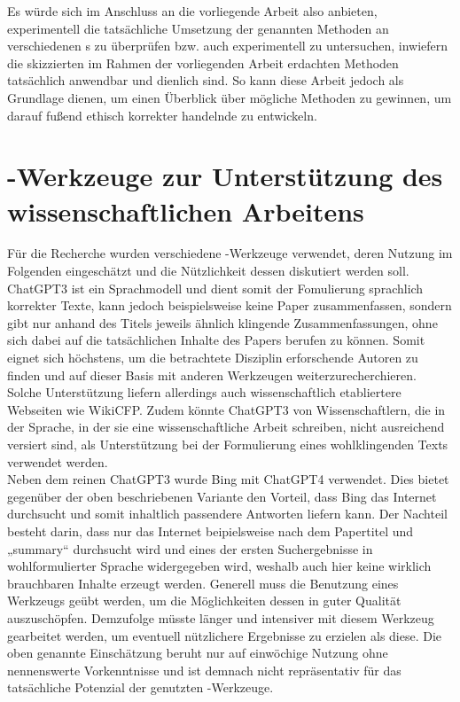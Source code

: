 \documentclass[hidelinks,12pt]{report}
\begin{document}
Es würde sich im Anschluss an die vorliegende Arbeit also anbieten, experimentell die tatsächliche Umsetzung der genannten Methoden an verschiedenen s zu überprüfen bzw. auch experimentell zu untersuchen, inwiefern die skizzierten im Rahmen der vorliegenden Arbeit erdachten Methoden tatsächlich anwendbar und dienlich sind.
So kann diese Arbeit jedoch als Grundlage dienen, um einen Überblick über mögliche Methoden zu gewinnen, um darauf fußend ethisch korrekter handelnde  zu entwickeln.


\chapter{-Werkzeuge zur Unterstützung des wissenschaftlichen Arbeitens}
Für die Recherche wurden verschiedene -Werkzeuge verwendet, deren Nutzung im Folgenden eingeschätzt und die Nützlichkeit dessen diskutiert werden soll. 
ChatGPT3 ist ein Sprachmodell und dient somit der Fomulierung sprachlich korrekter Texte, kann jedoch beispielsweise keine Paper zusammenfassen, sondern gibt nur anhand des Titels jeweils ähnlich klingende Zusammenfassungen, ohne sich dabei auf die tatsächlichen Inhalte des Papers berufen zu können. Somit eignet sich höchstens, um die betrachtete Disziplin erforschende Autoren zu finden und auf dieser Basis mit anderen Werkzeugen weiterzurecherchieren. Solche Unterstützung liefern allerdings auch wissenschaftlich etabliertere Webseiten wie WikiCFP. Zudem könnte ChatGPT3 von Wissenschaftlern, die in der Sprache, in der sie eine wissenschaftliche Arbeit schreiben, nicht ausreichend versiert sind, als Unterstützung bei der Formulierung eines wohlklingenden Texts verwendet werden.\\

Neben dem reinen ChatGPT3 wurde Bing mit ChatGPT4 verwendet. Dies bietet gegenüber der oben beschriebenen Variante den Vorteil, dass Bing das Internet durchsucht und somit inhaltlich passendere Antworten liefern kann. Der Nachteil besteht darin, dass nur das Internet beipielsweise nach dem Papertitel und „summary“ durchsucht wird und eines der ersten Suchergebnisse in wohlformulierter Sprache widergegeben wird, weshalb auch hier keine wirklich brauchbaren Inhalte erzeugt werden.
Generell muss die Benutzung eines Werkzeugs geübt werden, um die Möglichkeiten dessen in guter Qualität auszuschöpfen. Demzufolge  müsste länger und intensiver mit diesem Werkzeug gearbeitet werden, um eventuell nützlichere Ergebnisse zu erzielen als diese. Die oben genannte Einschätzung beruht nur auf einwöchige Nutzung ohne nennenswerte Vorkenntnisse und ist demnach nicht repräsentativ für das tatsächliche Potenzial der genutzten -Werkzeuge.\\
\end{document}
